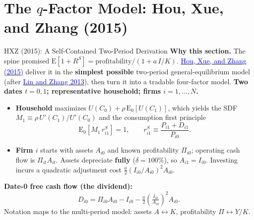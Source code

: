 \documentclass{beamer}
\begin{document}
\section{The \texorpdfstring{$q$}{q}-Factor Model: Hou, Xue, and Zhang (2015)}

\begin{frame}{HXZ (2015): A Self-Contained Two-Period Derivation}
	\textbf{Why this section.} The spine promised $\mathrm{E}[1+R^S]=\text{profitability}/(1+a\,I/K)$. \href{https://doi.org/10.1093/rfs/hhu068}{\textcolor{blue}{Hou, Xue, and Zhang (2015)}} deliver it in the \textbf{simplest possible} two-period general-equilibrium model (after \href{https://doi.org/10.1016/j.jmoneco.2013.01.001}{\textcolor{blue}{Lin and Zhang 2013}}), then turn it into a tradable four-factor model.
	\vspace{2pt}
	\textbf{Two dates $t=0,1$; representative household; firms $i=1,\dots,N$.}
	\begin{itemize}
		\item \textbf{Household} maximizes $U(C_0)+\rho\,\mathrm{E}_0[U(C_1)]$, which yields the SDF $M_1\equiv\rho\,U'(C_1)/U'(C_0)$ and the consumption first principle
		\[
			\mathrm{E}_0\!\left[M_1\,r^S_{i1}\right]=1,\qquad r^S_{i1}\equiv\frac{P_{i1}+D_{i1}}{P_{i0}}.
		\]
		\item \textbf{Firm $i$} starts with assets $A_{i0}$ and known profitability $\Pi_{i0}$; operating cash flow is $\Pi_{it}A_{it}$. Assets depreciate \textbf{fully} ($\delta=100\%$), so $A_{i1}=I_{i0}$. Investing incurs a quadratic adjustment cost $\frac{a}{2}(I_{i0}/A_{i0})^{2}A_{i0}$.
	\end{itemize}
	\textbf{Date-0 free cash flow (the dividend):}
	\[
		D_{i0}=\Pi_{i0}A_{i0}-I_{i0}-\tfrac{a}{2}\!\left(\tfrac{I_{i0}}{A_{i0}}\right)^{2}\!A_{i0}.
	\]
	{\footnotesize Notation maps to the multi-period model: assets $A\leftrightarrow K$, profitability $\Pi\leftrightarrow Y/K$.}
\end{frame}
\end{document}
